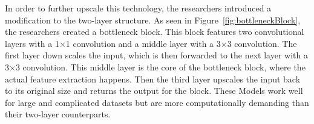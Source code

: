 \label{resnet152}
In order to further upscale this technology, the researchers introduced a modification to the two-layer structure. As seen in Figure~\ref{fig:bottleneckBlock}, the researchers created a bottleneck block. This block features two convolutional layers with a 1$\times$1 convolution and a middle layer with a  3$\times$3 convolution. The first layer down scales the input, which is then forwarded to the next layer with a 3$\times$3 convolution. This middle layer is the core of the bottleneck block, where the actual feature extraction happens. Then the third layer upscales the input back to its original size and returns the output for the block. These Models work well for large and complicated datasets but are more computationally demanding than their two-layer counterparts. 